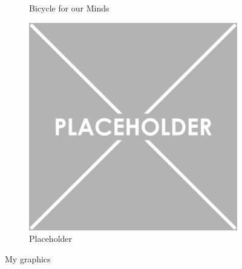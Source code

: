 \begin{landscape}
\begin{figure}
\begin{subfigure}[b]{0.3\textwidth}
    \caption{Bicycle for our Minds}
    \label{fig:Bicycle-for-our-Minds}
  \end{subfigure}             
  \begin{subfigure}[b]{0.3\textwidth}
    \includegraphics[width=\textwidth]{Placeholder}
    \caption{Placeholder}
    \label{fig:aPlaceholder}
  \end{subfigure}
  \caption{My graphics}
  \label{fig:myGraphics}
\end{figure}

\end{landscape}
